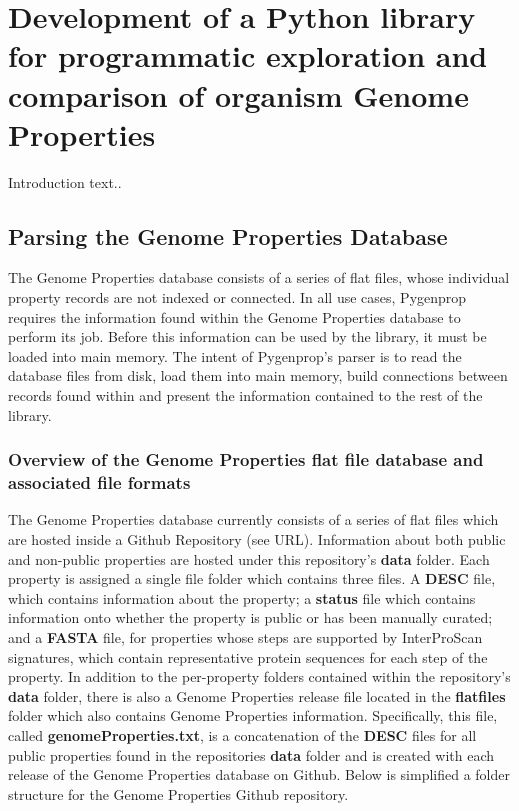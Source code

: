 \chapter{Development of a Python library for programmatic exploration and comparison of organism Genome Properties}

Introduction text..

\section{Parsing the Genome Properties Database}

The Genome Properties database consists of a series of flat files, whose individual property records are not indexed or connected. In all use cases, Pygenprop requires the information found within the Genome Properties database to perform its job. Before this information can be used by the library, it must be loaded into main memory.  The intent of Pygenprop's parser is to read the database files from disk, load them into main memory, build connections between records found within and present the information contained to the rest of the library. 

\subsection{Overview of the Genome Properties flat file database and associated file formats}

The Genome Properties database currently consists of a series of flat files which are hosted inside a Github Repository (see URL). Information about both public and non-public properties are hosted under this repository's \textbf{data} folder. Each property is assigned a single file folder which contains three files. A \textbf{DESC} file, which contains information about the property; a \textbf{status} file which contains information onto whether the property is public or has been manually curated; and a \textbf{FASTA} file, for properties whose steps are supported by InterProScan signatures, which contain representative protein sequences for each step of the property. In addition to the per-property folders contained within the repository's  \textbf{data} folder, there is also a Genome Properties release file located in the \textbf{flatfiles} folder which also contains Genome Properties information. Specifically, this file, called \textbf{genomeProperties.txt}, is a concatenation of the \textbf{DESC} files for all public properties found in the repositories \textbf{data} folder and is created with each release of the Genome Properties database on Github. Below is simplified a folder structure for the Genome Properties Github repository.

